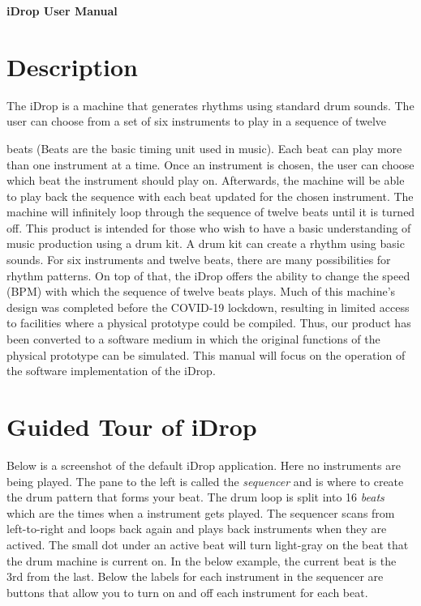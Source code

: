 \documentclass[11pt]{article}
\author{fbi}
\date{\today}
\title{}
\begin{document}
\begin{titlepage}
   \begin{center}
       \vspace*{1cm}


        {\textbf{\Huge iDrop User Manual}}


   \end{center}
\end{titlepage}


\section{Description}
\label{sec:org0f9fa96}
The iDrop is a machine that generates rhythms using standard drum
sounds. The user can choose from a set of six instruments to play in a
sequence of twelve

beats (Beats are the basic timing unit used in music). Each beat can
play more than one instrument at a time. Once an instrument is chosen,
the user can choose which beat the instrument should play
on. Afterwards, the machine will be able to play back the sequence
with each beat updated for the chosen instrument. The machine will
infinitely loop through the sequence of twelve beats until it is
turned off.  This product is intended for those who wish to have a
basic understanding of music production using a drum kit. A drum kit
can create a rhythm using basic sounds. For six instruments and twelve
beats, there are many possibilities for rhythm patterns. On top of
that, the iDrop offers the ability to change the speed (BPM) with
which the sequence of twelve beats plays.  Much of this machine’s
design was completed before the COVID-19 lockdown, resulting in
limited access to facilities where a physical prototype could be
compiled. Thus, our product has been converted to a software medium in
which the original functions of the physical prototype can be
simulated. This manual will focus on the operation of the software
implementation of the iDrop.

\section{Guided Tour of iDrop}
\label{sec:org7dd0dad}
Below is a screenshot of the default iDrop application. Here no
instruments are being played. The pane to the left is called the
\emph{sequencer} and is where to create the drum pattern that forms your
beat. The drum loop is split into 16 \emph{beats} which are the times
when a instrument gets played. The sequencer scans from left-to-right
and loops back again and plays back instruments when they are actived.
The small dot under an active beat will turn light-gray on the beat
that the drum machine is current on. In the below example, the current
beat is the 3rd from the last. Below the labels for each instrument in
the sequencer are buttons that allow you to turn on and off each instrument
for each beat.
\end{document}
